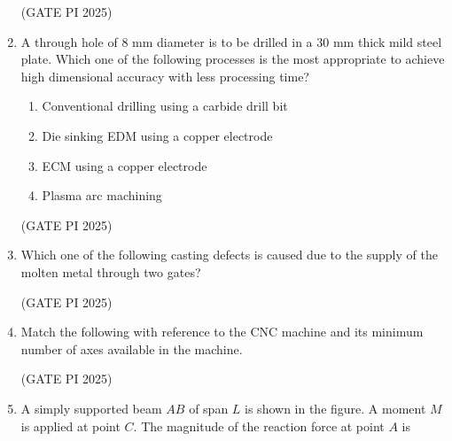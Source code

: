 \documentclass[journal,12pt,onecolumn]{IEEEtran}
\theoremstyle{remark}
\begin{document}
\begin{enumerate}
\hfill (GATE PI 2025)

\item A through hole of $8$ mm diameter is to be drilled in a $30$ mm thick mild steel plate. Which one of the following processes is the most appropriate to achieve high dimensional accuracy with less processing time?

\begin{enumerate}
\item Conventional drilling using a carbide drill bit
\item Die sinking EDM using a copper electrode
\item ECM using a copper electrode
\item Plasma arc machining
\end{enumerate}

\hfill (GATE PI 2025)

\item Which one of the following casting defects is caused due to the supply of the molten metal through two gates?
\begin{enumerate}
\end{enumerate}

\hfill (GATE PI 2025)

\item Match the following with reference to the CNC machine and its minimum number of axes available in the machine.



\begin{enumerate}
\end{enumerate}

\hfill (GATE PI 2025)

\item A simply supported beam $AB$ of span $L$ is shown in the figure. A moment $M$ is applied at point $C$. The magnitude of the reaction force at point $A$ is


\end{enumerate}
\end{document}
